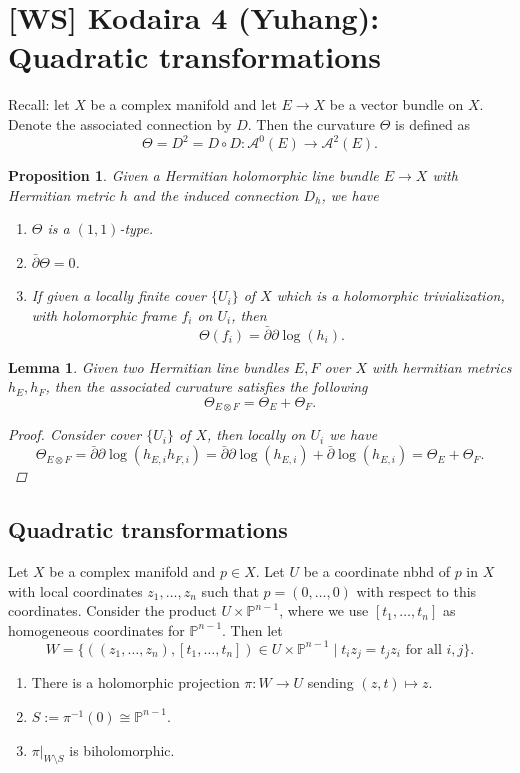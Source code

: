 \documentclass[12pt]{article}
\theoremstyle{darkgreentheorem}
\newtheorem{lm}[thm]{Lemma}
\newtheorem{prop}[thm]{Proposition}
\theoremstyle{darkbluedefinition}
\theoremstyle{darkredexample}
\theoremstyle{remark}
\newcommand{\1}{\mathbbm{1}}
\renewcommand{\P}{\mathbb{P}}
\newcommand{\A}{\mathscr{A}}
\newcommand{\ot}{\otimes}
\newcommand{\tms}{\times}
\begin{document}
\section{[WS] Kodaira 4 (Yuhang): Quadratic transformations}

Recall: let $X$ be a complex manifold and let $E\to X$ be a vector bundle on $X$.
Denote the associated connection by $D$.
Then the curvature $\Theta$ is defined as
\[ \Theta = D^{2} =D\circ D\colon \A^{0}(E)\to \A^{2}(E). \]

\begin{prop}
    Given a Hermitian holomorphic line bundle $E\to X$ with Hermitian metric $h$ and the induced connection $D_{h}$, we have
    \begin{enumerate}
	\item $\Theta$ is a $(1,1)$-type.
	\item $\bar{\partial} \Theta =0$.
	\item If given a locally finite cover $\{U_{i}\}$ of $X$ which is a holomorphic trivialization, with holomorphic frame $f_{i}$ on $U_{i}$, then
	    \[ \Theta(f_{i})=\bar{\partial}\partial \log(h_{i}). \]
    \end{enumerate}
\end{prop}

\begin{lm}
    Given two Hermitian line bundles $E,F$ over $X$ with hermitian metrics $h_{E},h_{F}$, then the associated curvature satisfies the following
    \[ \Theta_{E\ot F}=\Theta_{E}+\Theta_{F}. \]
    \begin{proof}
	Consider cover $\{U_{i}\}$ of $X$, then locally on $U_{i}$ we have
	\[ \Theta_{E\ot F}=\bar{\partial}\partial \log(h_{E,i}h_{F,i})=\bar{\partial}\partial \log(h_{E,i})+\bar{\partial}\log(h_{E,i})=\Theta_{E}+\Theta_{F}.\]
    \end{proof}
\end{lm}

\subsection{Quadratic transformations}

Let $X$ be a complex manifold and $p\in X$.
Let $U$ be a coordinate nbhd of $p$ in $X$ with local coordinates $z_{1},\ldots,z_{n}$ such that $p=(0,\ldots,0)$ with respect to this coordinates.
Consider the product $U\tms \P^{n-1}$, where we use $[t_{1},\ldots,t_{n}]$ as homogeneous coordinates for $\P^{n-1}$.
Then let
\[ W=\{ ((z_{1},\ldots,z_{n}),[t_{1},\ldots,t_{n}])\in U\tms \P^{n-1} \mid t_{i}z_{j}=t_{j}z_{i} \text{ for all } i,j\}.\]
\begin{enumerate}
    \item There is a holomorphic projection $\pi\colon W\to U$ sending $(z,t)\mapsto z$.
    \item $S:=\pi^{-1}(0)\cong \P^{n-1}$.
    \item $\pi|_{W\setminus S}$ is biholomorphic.
\end{enumerate}
\end{document}
